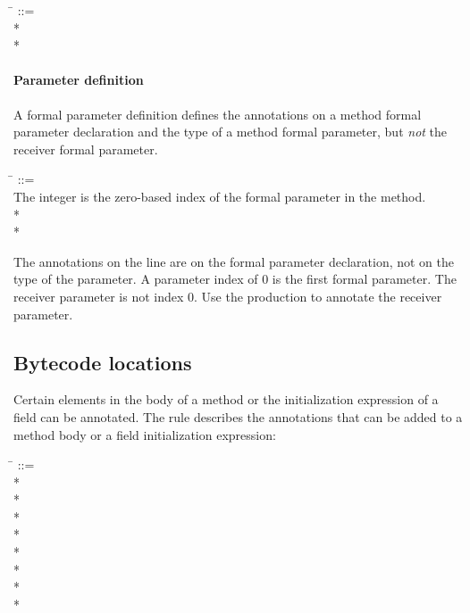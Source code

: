 \documentclass{article}
\begin{document}
\begin{tabbing}
\qquad \= \kill
{} ::=  \\
\qquad    {} * \lineend \\
\qquad    {}*
\end{tabbing}


\paragraph{Parameter definition}

A formal parameter definition defines the annotations on a method formal
parameter declaration and the type of a method formal parameter, but
\emph{not} the receiver formal parameter.

\begin{tabbing}
\qquad \= \kill
{} ::= \\
\qquad    \bnfcmt The integer is the zero-based index of the formal parameter in the method. \\
\qquad    {}  \bnflit{:} * \lineend \\
\qquad    {}*
\end{tabbing}

\noindent
The annotations on the  line are on the formal parameter
declaration, not on the type of the parameter. A parameter index of 0 is the
first formal parameter. The receiver parameter is not index 0. Use the
 production to annotate the receiver parameter.


\subsection{Bytecode locations}\label{bytecode-locations}

Certain elements in the body of a method or the initialization expression of a
field can be annotated. The  rule describes the
annotations that can be added to a method body or a field initialization
expression:

\begin{tabbing}
\qquad \= \kill
{} ::= \\
\qquad    {}* \\
\qquad    {}* \\
\qquad    {}* \\
\qquad    {}* \\
\qquad    {}* \\
\qquad    {}* \\
\qquad    {}* \\
\qquad    {}*
\end{tabbing}
\end{document}
